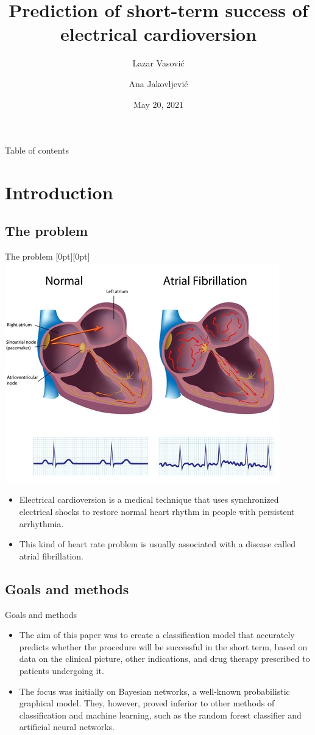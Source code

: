 \documentclass[hyperref={bookmarks=false}]{beamer}
\title[Electrical cardioversion]{Prediction of short-term success of electrical cardioversion}
\author{Lazar Vasović \and Ana Jakovljević}
\institute[]{Faculty of Mathematics, University of Belgrade\\\url{https://github.com/matfija/Elektrokonverzija}}
\date[Faculty of Mathematics]{May 20, 2021}
\newcommand{\lenitem}[2][.51\linewidth]{\parbox[t]{#1}{\strut #2\strut}}
\begin{document}
\frame{\titlepage}

\begin{frame}{Table of contents}
\tableofcontents[subsectionstyle=hide]
\end{frame}

\section{Introduction}
\subsection{The problem}
\begin{frame}{The problem}
\mbox{}\hfill\raisebox{-\height}[0pt][0pt]{\includegraphics[width=.42\linewidth]{fibrillation.jpg}}
\vspace*{-\baselineskip}

\begin{itemize}
    \item \lenitem{Electrical cardioversion is a medical technique that uses synchronized electrical shocks to restore normal heart rhythm in people with persistent arrhythmia.}

    \item \lenitem{This kind of heart rate problem is usually associated with a disease called atrial fibrillation.}
\end{itemize}
\end{frame}

\subsection{Goals and methods}
\begin{frame}{Goals and methods}
\begin{itemize}
    \item The aim of this paper was to create a classification model that accurately predicts whether the procedure will be successful in the short term, based on data on the clinical picture, other indications, and drug therapy prescribed to patients undergoing it.

    \item The focus was initially on Bayesian networks, a well-known probabilistic graphical model. They, however, proved inferior to other methods of classification and machine learning, such as the random forest classifier and artificial neural networks.
\end{itemize}
\end{frame}
\end{document}
